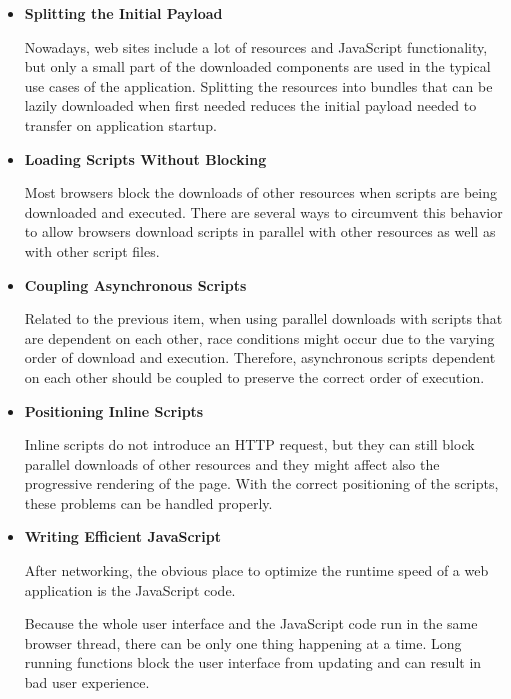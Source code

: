 \begin{itemize}


\item \textbf{Splitting the Initial Payload}

  Nowadays, web sites include a lot of resources and JavaScript
  functionality, but only a small part of the downloaded components
  are used in the typical use cases of the application. Splitting the
  resources into bundles that can be lazily downloaded when first
  needed reduces the initial payload needed to transfer on application
  startup.

\item \textbf{Loading Scripts Without Blocking}

  Most browsers block the downloads of other resources when scripts
  are being downloaded and executed. There are several ways to
  circumvent this behavior to allow browsers download scripts in
  parallel with other resources as well as with other script files.

\item \textbf{Coupling Asynchronous Scripts}

  Related to the previous item, when using parallel downloads with
  scripts that are dependent on each other, race conditions might
  occur due to the varying order of download and execution. Therefore,
  asynchronous scripts dependent on each other should be coupled to
  preserve the correct order of execution.

\item \textbf{Positioning Inline Scripts}

  Inline scripts do not introduce an HTTP request, but they can still
  block parallel downloads of other resources and they might affect
  also the progressive rendering of the page. With the correct
  positioning of the scripts, these problems can be handled properly.

\item \textbf{Writing Efficient JavaScript}

  After networking, the obvious place to optimize the runtime speed of
  a web application is the JavaScript code.

  Because the whole user interface and the JavaScript code run in the
  same browser thread, there can be only one thing happening at a
  time. Long running functions block the user interface from updating
  and can result in bad user experience.


\end{itemize}
